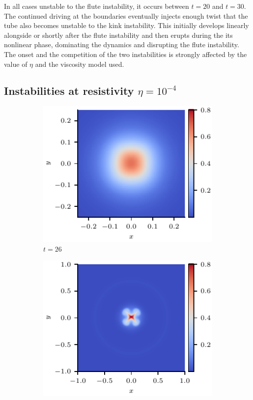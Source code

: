 \documentclass[fleqn,usenatbib]{mnras}
\begin{document}
In all cases unstable to the flute instability, it
occurs  between $t=20$ and $t=30$. The continued driving at the boundaries eventually
injects enough twist that the tube also becomes unstable to the kink
instability. This initially develops linearly alongside or shortly
after the flute instability and then erupts during the
its  nonlinear phase, dominating the dynamics and
disrupting the   flute instability. The onset and
the competition of the two instabilities is strongly affected by
the value of $\eta$ and the viscosity model used. 

\subsection{Instabilities at resistivity $\eta=10^{-4}$}

\begin{figure}
  \centering
    \begin{subfigure}{0.32\textwidth}
      \includegraphics[width=\linewidth]{swi-4_pressure_13.pdf}
      \caption{$t=26$}
      \label{fig:swi-4_pressure_13}
    \end{subfigure}
    \hfill
    \begin{subfigure}{0.32\textwidth}
      \includegraphics[width=\linewidth]{swi-4_pressure_14.pdf}

\end{subfigure}
\end{figure}
\end{document}
